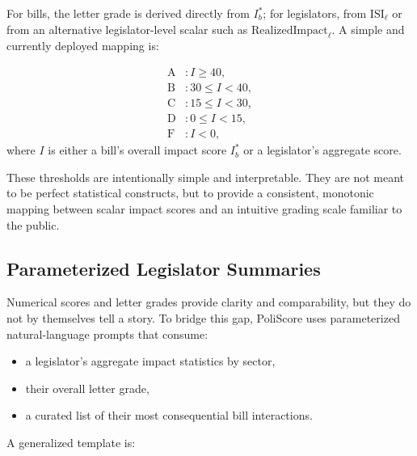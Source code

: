 \documentclass[12pt]{article}
\begin{document}
For bills, the letter grade is derived directly from \(I_b^{\ast}\); for legislators, from \(\text{ISI}_{\ell}\) or from
an alternative legislator-level scalar such as \(\text{RealizedImpact}_{\ell}\). A simple and currently deployed mapping
is:

\begin{align*}
    \text{A} &: I \geq 40, \\
    \text{B} &: 30 \leq I < 40, \\
    \text{C} &: 15 \leq I < 30, \\
    \text{D} &: 0 \leq I < 15, \\
    \text{F} &: I < 0,
\end{align*}
where \(I\) is either a bill's overall impact score \(I_b^{\ast}\) or a legislator's aggregate score.

These thresholds are intentionally simple and interpretable. They are not meant to be perfect statistical constructs, but
to provide a consistent, monotonic mapping between scalar impact scores and an intuitive grading scale familiar to the
public.

\subsection{Parameterized Legislator Summaries}

Numerical scores and letter grades provide clarity and comparability, but they do not by themselves tell a story. To bridge
this gap, PoliScore uses parameterized natural-language prompts that consume:

\begin{itemize}
    \item a legislator's aggregate impact statistics by sector,
    \item their overall letter grade,
    \item a curated list of their most consequential bill interactions.
\end{itemize}

A generalized template is:
\end{document}
